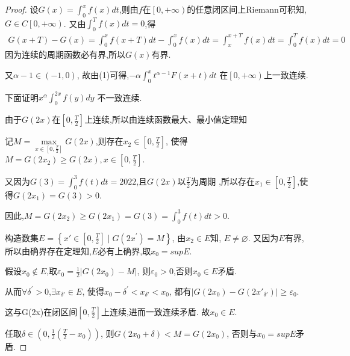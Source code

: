 \documentclass[lang=cn,newtx,10pt,scheme=chinese]{../Template/elegantbook}
\begin{document}
\begin{proof}
设$G(x)=\int_0^x{f\left( x \right)}dt$,则由$f$在$\left[ 0,+\infty \right)$的任意闭区间上Riemann可积知,
$G\in C\left[ 0,+\infty \right) $.
又由$\int_0^T{f\left( x \right)}dt=0$,得
\begin{equation}
\begin{split}
G\left( x+T \right) -G\left( x \right) =\int_0^x{f\left( x+T \right)}dt-\int_0^x{f\left( x \right)}dt=\int_x^{x+T}{f\left( x \right)}dt=\int_0^T{f\left( x \right)}dt=0
\end{split}
\nonumber
\end{equation}
因为连续的周期函数必有界,所以$G(x)$有界.

又$\alpha -1\in \left( -1,0 \right) $,
故由(1)可得,$-\alpha \int_0^x{t^{\alpha -1}F\left( x+t \right)}dt$
在$\left[ 0,+\infty \right) $上一致连续.

下面证明$x^{\alpha}\int_0^{2x}{f\left( y \right) dy}$
不一致连续.

由于$G(2x)$在$\left[ 0,\frac{T}{2} \right] $上连续,所以由连续函数最大、最小值定理知

记$M=\underset{x\in \left[ 0,\frac{T}{2} \right]}{\max}G\left( 2x \right) $,则存在$x_2\in \left[ 0,\frac{T}{2} \right] $,
使得$M=G\left( 2x_2 \right) \geqslant G\left( 2x \right) ,x\in \left[ 0,\frac{T}{2} \right] $.

又因为$G(3)=\int_0^3{f\left( t \right) dt}=2022$,且$G(2x)$以$\frac{T}{2}$为周期
,所以存在$x_1\in \left[ 0,\frac{T}{2} \right] $,使得$G(2x_1)=G(3)>0$.

因此,$M=G{\left( 2x_2 \right)}\geqslant G(2x_1)=G\left( 3 \right) =\int_0^3{f\left( t \right) dt}>0$.

构造数集$E=\left\{ x'\in \left[ 0,\frac{T}{2} \right] \mid G\left( 2x^{\prime} \right) =M \right\} $,
由$x_2\in E$知,
$E\ne \varnothing $.
又因为$E$有界,所以由确界存在定理知,$E$必有上确界,取$x_0=supE$.

假设$x_0\notin E$,取$\varepsilon _0=\frac{1}{2}\left| G\left( 2x_0 \right) -M \right|$,
则$\varepsilon _0>0$,否则$x_0\in E$矛盾.

从而$\forall \delta ^{\prime}>0$,$\exists x_{\delta'}\in E$,
使得$ x_0-\delta ^{\prime}<x_{\delta'}<x_0$,
都有$\left| G\left( 2x_0 \right) -G\left( 2x'_{\delta'} \right) \right|\geqslant \varepsilon _0$.

这与G(2x)在闭区间$\left[ 0,\frac{T}{2} \right]$上连续,进而一致连续矛盾.
故$x_0\in E$.

任取$\delta \in \left( 0,\frac{1}{2}\left( \frac{T}{2}-x_0 \right) \right) $,
则$G\left( 2x_0+\delta \right) <M=G\left( 2x_0 \right) $,
否则与$x_0=supE$矛盾.


\end{proof}
\end{document}
